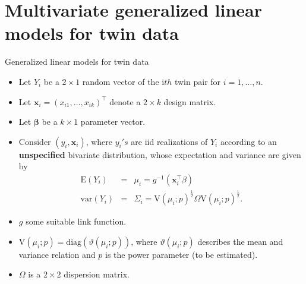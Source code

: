\documentclass[
  ignorenonframetext,
  serif,
  professionalfont,
  usenames,
  dvipsnames,
  aspectratio = 169]{beamer}
\providecommand{\tightlist}{%
  \setlength{\itemsep}{0pt}\setlength{\parskip}{0pt}}
\renewcommand{\tightlist}{%
  \setlength{\itemsep}{0\baselineskip}
  \setlength{\parskip}{0.25\baselineskip}
}
\begin{document}
\hypertarget{multivariate-generalized-linear-models-for-twin-data}{%
\section{Multivariate generalized linear models for twin
data}\label{multivariate-generalized-linear-models-for-twin-data}}

\begin{frame}{Generalized linear models for twin data}
\protect\hypertarget{generalized-linear-models-for-twin-data}{}
\begin{itemize}
\tightlist
\item
  Let \(Y_{i}\) be a \(2 \times 1\) random vector of the i\(th\) twin
  pair for \(i = 1, \ldots, n\).
\item
  Let \(\mathbf{x}_{i} = (x_{i1}, \ldots, x_{ik})^{\top}\) denote a
  \(2 \times k\) design matrix.
\item
  Let \(\boldsymbol{\beta}\) be a \(k \times 1\) parameter vector.
\item
  Consider \((y_{i},\mathbf{x}_{i})\), where \(y_{i}'s\) are iid
  realizations of \(Y_{i}\) according to an \textbf{unspecified}
  bivariate distribution, whose expectation and variance are given by
  \begin{eqnarray}
  \label{modelGLM}
  \mathrm{E}(Y_i) &=& \mu_i = g^{-1}(\mathbf{x}_{i}^{\top}\beta)  \nonumber \\
  \mathrm{var}(Y_i) &=& \Sigma_i = \mathrm{V}(\mu_i;p)^{\frac{1}{2}}\Omega\mathrm{V}(\mu_i;p)^{\frac{1}{2}}.
  \end{eqnarray}
\item
  \(g\) some suitable link function.
\item
  \(\mathrm{V}(\mu_i;p) = \mathrm{diag}(\vartheta(\mu_i;p))\), where
  \(\vartheta(\mu_i;p)\) describes the mean and variance relation and
  \(p\) is the power parameter (to be estimated).
\item
  \(\Omega\) is a \(2 \times 2\) dispersion matrix.
\end{itemize}
\end{frame}
\end{document}
